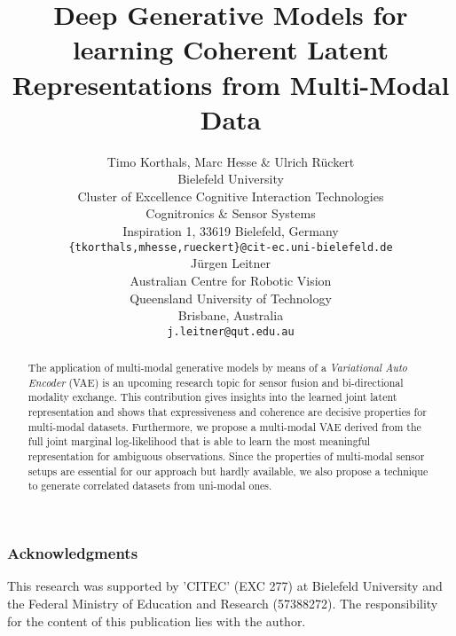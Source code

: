 \documentclass{article} %
\title{Deep Generative Models for learning Coherent Latent Representations from Multi-Modal Data}
\author{Timo Korthals, Marc Hesse \& Ulrich Rückert\\
Bielefeld University\\
Cluster of Excellence Cognitive Interaction Technologies\\
Cognitronics \& Sensor Systems\\
Inspiration 1, 33619 Bielefeld, Germany\\
\texttt{\{tkorthals,mhesse,rueckert\}@cit-ec.uni-bielefeld.de} \\
\And
J\"urgen Leitner\\
Australian Centre for Robotic Vision\\
Queensland University of Technology\\
Brisbane, Australia\\
\texttt{j.leitner@qut.edu.au} \\
}
\renewcommand{\(}{\mathopen{}\left(}
\renewcommand{\)}{\right)\mathclose{}}
\renewcommand{\[}{\mathopen{}\left[}
\renewcommand{\]}{\right]\mathclose{}}
\begin{document}
\iclrfinalcopy

\maketitle

\begin{abstract}
The application of multi-modal generative models by means of a \textit{Variational Auto Encoder} (VAE) is an upcoming research topic for sensor fusion and bi-directional modality exchange.
%
This contribution gives insights into the learned joint latent representation and shows that expressiveness and coherence are decisive properties for multi-modal datasets.
%
Furthermore, we propose a multi-modal VAE derived from the full joint marginal log-likelihood that is able to learn the most meaningful representation for ambiguous observations.
%
Since the properties of multi-modal sensor setups are essential for our approach but hardly available, we also propose a technique to generate correlated datasets from uni-modal ones.

\end{abstract}

%

%

%



%

%

\subsubsection*{Acknowledgments}

This research was supported by 'CITEC' (EXC 277) at Bielefeld University and the Federal Ministry of Education and Research (57388272). The responsibility for the content of this publication lies with the author.

%




\end{document}
